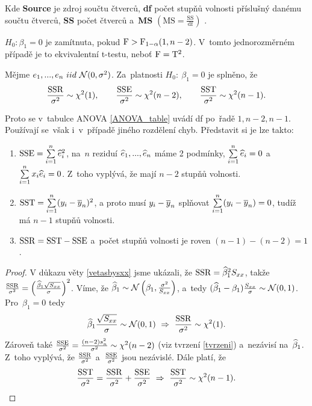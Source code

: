 Kde \textbf{Source} je zdroj součtu čtverců, \textbf{df} počet stupňů volnosti příslušný danému součtu čtverců, \textbf{SS} počet čtverců a~\textbf{MS} $(\mathrm{MS} = \frac{\mathrm{SS}}{\mathrm{df}})$ .
\begin{remark}
	 $H_0:\beta_1 = 0$ je zamítnuta, pokud $\mathrm{F}>\mathrm{F}_{1-\alpha}(1,n-2)$. V~tomto jednorozměrném případě je to ekvivalentní t-testu, neboť $\mathrm{F} = \mathrm{T}^2$.
\end{remark}
\begin{theorem}
	Mějme $e_1,...,e_n~iid~\mathcal{N}(0,\sigma^2)$. Za~platnosti $H_0:~\beta_1 = 0$ je splněno, že
	 $$ \frac{\mathrm{SSR}}{\sigma^2}\sim\chi^2(1),\qquad\frac{\mathrm{SSE}}{\sigma^2}\sim\chi^2(n-2),\qquad\frac{\mathrm{SST}}{\sigma^2}\sim\chi^2(n-1). $$
\end{theorem}
\begin{remark}
	Proto se v~tabulce ANOVA \ref{ANOVA_table} uvádí df po~řadě $1,n-2,n-1$. Používají se~však i~v~případě jiného rozdělení chyb. Představit si je lze takto:
	\begin{enumerate}
		\item $\mathrm{SSE} = \sum\limits_{i=1}^{n} \widehat{e}_i^2$, na~$n$ reziduí $\widehat{e}_1,...,\widehat{e}_n$ máme 2 podmínky, $\sum\limits_{i=1}^{n} \widehat{e}_i = 0$ a~$\sum\limits_{i=1}^{n} x_i\widehat{e}_i = 0$. Z~toho vyplývá, že mají $n-2$ stupňů volnosti.
		\item $\mathrm{SST} = \sum\limits_{i=1}^{n} (y_i-\overline{y}_n)^2$, a proto musí $y_i-\overline{y}_n$ splňovat $\sum\limits_{i=1}^{n} (y_i-\overline{y}_n) = 0$, tudíž má $n-1$ stupňů volnosti.
		\item $\mathrm{SSR} = \mathrm{SST}-\mathrm{SSE}$ a~počet stupňů volnosti je roven $(n-1)-(n-2) = 1$.
	\end{enumerate}
\begin{proof}
	V důkazu věty \ref{vetasbysxx} jsme ukázali, že $\mathrm{SSR} = \widehat{\beta}_1^2 S_{xx}$, takže $\frac{\mathrm{SSR}}{\sigma^2} = \left(\frac{\widehat{\beta}_1\sqrt{S_{xx}}}{\sigma} \right)^2$. Víme, že $\widehat{\beta}_1\sim\mathcal{N}\left(\beta_1,\frac{\sigma^2}{S_{xx}}\right)$, a~tedy $(\widehat{\beta}_1-\beta_1)\frac{S_{xx}}{\sigma}\sim\mathcal{N}(0,1)$. Pro~$\beta_1 = 0$ tedy $$ \widehat{\beta}_1\frac{\sqrt{S_{xx}}}{\sigma}\sim\mathcal{N}(0,1)~\Rightarrow~\frac{\mathrm{SSR}}{\sigma^2}\sim\chi^2(1). $$
	Zároveň také $\frac{\mathrm{SSE}}{\sigma^2} = \frac{(n-2)s_n^2}{\sigma^2}\sim\chi^2(n-2)$ (viz tvrzení \ref{tvrzeni}) a~nezávisí na~$\widehat{\beta}_1$. Z~toho vyplývá, že $\frac{\mathrm{SSR}}{\sigma^2}$ a~$\frac{\mathrm{SSE}}{\sigma^2}$ jsou nezávislé. Dále platí, že
	 $$ \frac{\mathrm{SST}}{\sigma^2} = \frac{\mathrm{SSR}}{\sigma^2}+\frac{\mathrm{SSE}}{\sigma^2}~\Rightarrow~\frac{\mathrm{SST}}{\sigma^2}\sim\chi^2(n-1). $$
\end{proof}
\end{remark}
